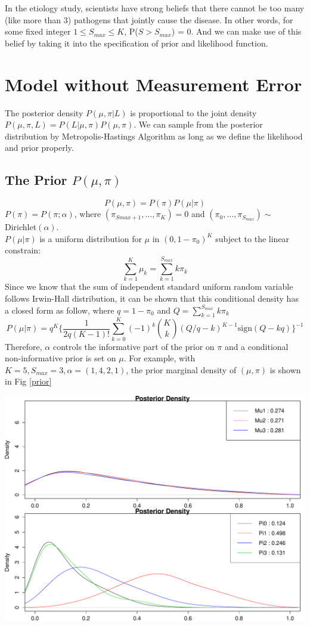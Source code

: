 \documentclass[11 pt, a4paper]{article}  %
\begin{document}
In the etiology study, scientists have strong beliefs that there cannot be too many (like more than 3) pathogens that jointly cause the disease. In other words, for some fixed integer $1\leq S_{max} \leq K$, P($S > S_{max}$) = 0. And we can make use of this belief by taking it into the specification of prior and likelihood function.
  

\section{Model without Measurement Error}
The posterior density $P(\mu, \pi | L)$ is proportional to the joint density $P(\mu, \pi, L) = P(L | \mu, \pi)P(\mu,\pi)$. We can sample from the posterior distribution by Metropolis-Hastings Algorithm as long as we define the likelihood and prior properly. 
\subsection{The Prior $P(\mu, \pi)$}
\[P(\mu,\pi) =  P(\pi) P(\mu | \pi)\]
$P(\pi) = P(\pi; \alpha)$, where $(\pi_{Smax+1}, \ldots, \pi_K)=0$ and $(\pi_0,\ldots, \pi_{S_{max}}) \sim$ Dirichlet$(\alpha)$. \\
$P(\mu | \pi)$ is a uniform distribution for $\mu$ in $(0,1-\pi_0)^K$ subject to the linear constrain:
\[ \sum_{k=1}^K \mu_k = \sum_{k=1}^{S_{max}} k\pi_{k}\]
Since we know that the sum of independent standard uniform random variable follows Irwin-Hall distribution, it can be shown that this conditional density has a closed form as follow, where $q = 1-\pi_0$ and $Q=\sum_{k=1}^{S_{max}} k\pi_{k}$
\[ P(\mu | \pi) = q^K \Big \{\frac{1}{2q(K-1)!} \sum_{k=0}^K (-1)^k {K \choose k} (Q/q-k)^{K-1} \text{sign}(Q-kq) \Big \}^{-1} \]
Therefore, $\alpha$ controls the informative part of the prior on $\pi$ and a conditional non-informative prior is set on $\mu$. For example, with $K=5, S_{max}=3, \alpha=(1,4,2,1)$, the prior marginal density of $(\mu, \pi)$ is shown in Fig \ref{prior}

\begin{center}
\includegraphics[scale=0.5]{dirich_uniform_prior.pdf}
\label{prior}
\end{center}
\end{document}
